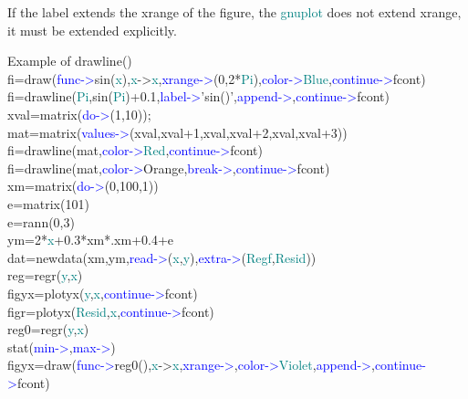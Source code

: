 \begin{note} 
If the label extends the xrange of the figure, the \textcolor{teal}{gnuplot} does not extend xrange, 
it must be extended explicitly. 
\end{note} 
\singlespacing 
\begin{example}[drawlineex]Example of \textcolor{VioletRed}{drawline}()\\ 
\label{drawlineex} 
\noindent fi=\textcolor{VioletRed}{draw}(\textcolor{blue}{func->}\textcolor{VioletRed}{sin}(\textcolor{teal}{x}),\textcolor{teal}{x}->\textcolor{teal}{x},\textcolor{blue}{xrange->}(0,2*\textcolor{teal}{Pi}),\textcolor{blue}{color->}\textcolor{teal}{Blue},\textcolor{blue}{continue->}fcont)\\ 
fi=\textcolor{VioletRed}{drawline}(\textcolor{teal}{Pi},\textcolor{VioletRed}{sin}(\textcolor{teal}{Pi})+0.1,\textcolor{blue}{label->}'\textcolor{VioletRed}{sin}()',\textcolor{blue}{append->},\textcolor{blue}{continue->}fcont)\\ 
xval=\textcolor{VioletRed}{matrix}(\textcolor{blue}{do->}(1,10));\\ 
mat=\textcolor{VioletRed}{matrix}(\textcolor{blue}{values->}(xval,xval+1,xval,xval+2,xval,xval+3))\\ 
fi=\textcolor{VioletRed}{drawline}(mat,\textcolor{blue}{color->}\textcolor{teal}{Red},\textcolor{blue}{continue->}fcont)\\ 
fi=\textcolor{VioletRed}{drawline}(mat,\textcolor{blue}{color->}Orange,\textcolor{blue}{break->},\textcolor{blue}{continue->}fcont)\\ 
xm=\textcolor{VioletRed}{matrix}(\textcolor{blue}{do->}(0,100,1))\\ 
e=\textcolor{VioletRed}{matrix}(101)\\ 
e=\textcolor{VioletRed}{rann}(0,3)\\ 
ym=2*\textcolor{teal}{x}+0.3*xm*.xm+0.4+e\\ 
dat=\textcolor{VioletRed}{newdata}(xm,ym,\textcolor{blue}{read->}(\textcolor{teal}{x},\textcolor{teal}{y}),\textcolor{blue}{extra->}(\textcolor{teal}{Regf},\textcolor{teal}{Resid}))\\ 
reg=\textcolor{VioletRed}{regr}(\textcolor{teal}{y},\textcolor{teal}{x})\\ 
figyx=\textcolor{VioletRed}{plotyx}(\textcolor{teal}{y},\textcolor{teal}{x},\textcolor{blue}{continue->}fcont)\\ 
figr=\textcolor{VioletRed}{plotyx}(\textcolor{teal}{Resid},\textcolor{teal}{x},\textcolor{blue}{continue->}fcont)\\ 
reg0=\textcolor{VioletRed}{regr}(\textcolor{teal}{y},\textcolor{teal}{x})\\ 
\textcolor{VioletRed}{stat}(\textcolor{blue}{min->},\textcolor{blue}{max->})\\ 
figyx=\textcolor{VioletRed}{draw}(\textcolor{blue}{func->}reg0(),\textcolor{teal}{x}->\textcolor{teal}{x},\textcolor{blue}{xrange->},\textcolor{blue}{color->}\textcolor{teal}{Violet},\textcolor{blue}{append->},\textcolor{blue}{continue->}fcont)\\ 
 

\end{example}
